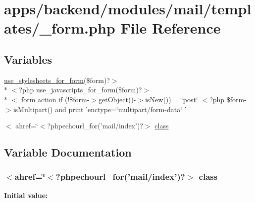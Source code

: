\hypertarget{backend_2modules_2mail_2templates_2__form_8php}{\section{apps/backend/modules/mail/templates/\-\_\-form.php File Reference}
\label{backend_2modules_2mail_2templates_2__form_8php}
}
\subsection*{Variables}
\begin{DoxyCompactItemize}
\item 
\hyperlink{live_2modules_2user_2templates_2__form_8php_a86bc4522fdbe625b07bc4a4d6eec3df7}{use\-\_\-stylesheets\-\_\-for\-\_\-form}(\$form)?$>$\\*
$<$?php use\-\_\-javascripts\-\_\-for\-\_\-form(\$form)?$>$\\*
$<$ form action \hyperlink{backend_2modules_2mail_2templates_2__form_8php_ae30a307b320d8da5d9a945eaf68f7549}{if} (!\$form-\/$>$get\-Object()-\/$>$is\-New()) = \char`\"{}post\char`\"{} $<$?php \$form-\/$>$is\-Multipart() and print 'enctype=\char`\"{}multipart/form-\/data\char`\"{} '
\item 
$<$ ahref=\char`\"{}$<$?phpechourl\-\_\-for('mail/index')?$>$ \hyperlink{backend_2modules_2mail_2templates_2__form_8php_a96438765a41cb273a188d8f2cb81892b}{class}
\end{DoxyCompactItemize}


\subsection{Variable Documentation}
\hypertarget{backend_2modules_2mail_2templates_2__form_8php_a96438765a41cb273a188d8f2cb81892b}{
\subsubsection[{class}]{\setlength{\rightskip}{0pt plus 5cm}$<$ahref=\char`\"{}$<$?phpechourl\-\_\-for('mail/index')?$>$ class}}\label{backend_2modules_2mail_2templates_2__form_8php_a96438765a41cb273a188d8f2cb81892b}
{\bfseries Initial value\-:}



